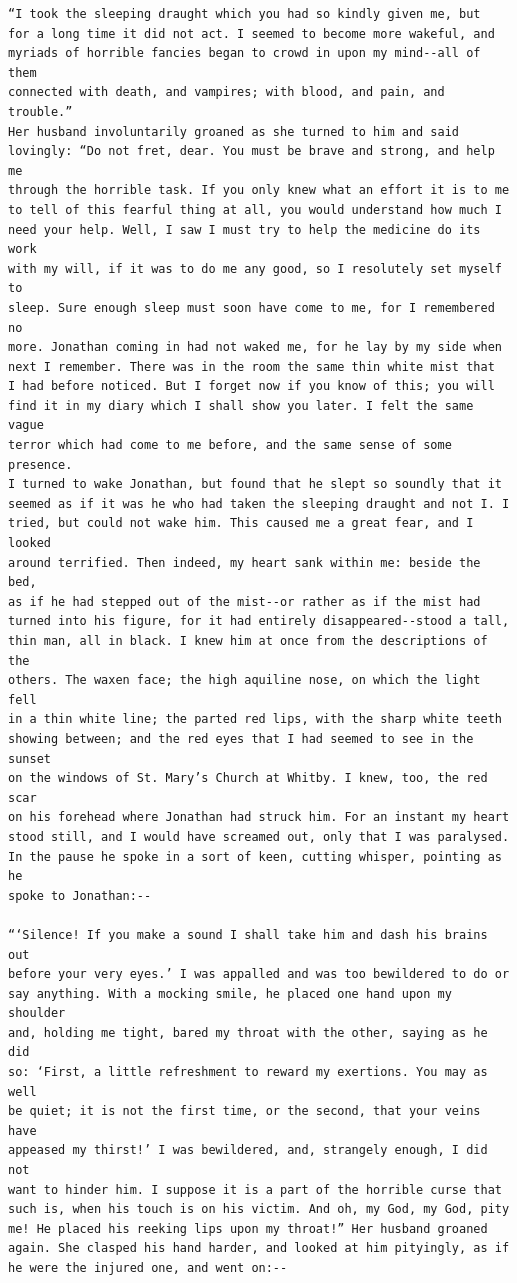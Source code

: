 \documentclass{article}
\begin{document}
\begin{verbatim}
“I took the sleeping draught which you had so kindly given me, but
for a long time it did not act. I seemed to become more wakeful, and
myriads of horrible fancies began to crowd in upon my mind--all of them
connected with death, and vampires; with blood, and pain, and trouble.”
Her husband involuntarily groaned as she turned to him and said
lovingly: “Do not fret, dear. You must be brave and strong, and help me
through the horrible task. If you only knew what an effort it is to me
to tell of this fearful thing at all, you would understand how much I
need your help. Well, I saw I must try to help the medicine do its work
with my will, if it was to do me any good, so I resolutely set myself to
sleep. Sure enough sleep must soon have come to me, for I remembered no
more. Jonathan coming in had not waked me, for he lay by my side when
next I remember. There was in the room the same thin white mist that
I had before noticed. But I forget now if you know of this; you will
find it in my diary which I shall show you later. I felt the same vague
terror which had come to me before, and the same sense of some presence.
I turned to wake Jonathan, but found that he slept so soundly that it
seemed as if it was he who had taken the sleeping draught and not I. I
tried, but could not wake him. This caused me a great fear, and I looked
around terrified. Then indeed, my heart sank within me: beside the bed,
as if he had stepped out of the mist--or rather as if the mist had
turned into his figure, for it had entirely disappeared--stood a tall,
thin man, all in black. I knew him at once from the descriptions of the
others. The waxen face; the high aquiline nose, on which the light fell
in a thin white line; the parted red lips, with the sharp white teeth
showing between; and the red eyes that I had seemed to see in the sunset
on the windows of St. Mary’s Church at Whitby. I knew, too, the red scar
on his forehead where Jonathan had struck him. For an instant my heart
stood still, and I would have screamed out, only that I was paralysed.
In the pause he spoke in a sort of keen, cutting whisper, pointing as he
spoke to Jonathan:--

“‘Silence! If you make a sound I shall take him and dash his brains out
before your very eyes.’ I was appalled and was too bewildered to do or
say anything. With a mocking smile, he placed one hand upon my shoulder
and, holding me tight, bared my throat with the other, saying as he did
so: ‘First, a little refreshment to reward my exertions. You may as well
be quiet; it is not the first time, or the second, that your veins have
appeased my thirst!’ I was bewildered, and, strangely enough, I did not
want to hinder him. I suppose it is a part of the horrible curse that
such is, when his touch is on his victim. And oh, my God, my God, pity
me! He placed his reeking lips upon my throat!” Her husband groaned
again. She clasped his hand harder, and looked at him pityingly, as if
he were the injured one, and went on:--


\end{verbatim}
\end{document}
